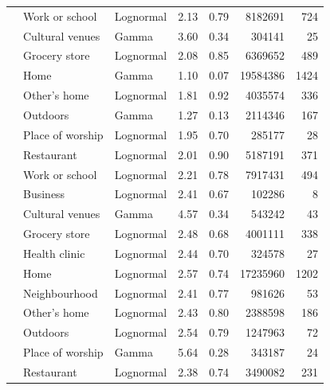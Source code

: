 \documentclass[preprint, 3p,
authoryear]{elsarticle} %
\begin{document}
\begin{table}
{\begin{threeparttable}
\begin{tabular}[t]{rllrrrr}
\multirow[t]{-8}{*}{\raggedleft\arraybackslash 2005} & Work or school & Lognormal & 2.13 & 0.79 & 8182691 & 724\\
\cmidrule{1-7}
 & Cultural venues & Gamma & 3.60 & 0.34 & 304141 & 25\\

 & Grocery store & Lognormal & 2.08 & 0.85 & 6369652 & 489\\

 & Home & Gamma & 1.10 & 0.07 & 19584386 & 1424\\

 & Other's home & Lognormal & 1.81 & 0.92 & 4035574 & 336\\

 & Outdoors & Gamma & 1.27 & 0.13 & 2114346 & 167\\

 & Place of worship & Lognormal & 1.95 & 0.70 & 285177 & 28\\

 & Restaurant & Lognormal & 2.01 & 0.90 & 5187191 & 371\\

\multirow[t]{-8}{*}{\raggedleft\arraybackslash 2010} & Work or school & Lognormal & 2.21 & 0.78 & 7917431 & 494\\
\cmidrule{1-7}
 & Business & Lognormal & 2.41 & 0.67 & 102286 & 8\\

 & Cultural venues & Gamma & 4.57 & 0.34 & 543242 & 43\\

 & Grocery store & Lognormal & 2.48 & 0.68 & 4001111 & 338\\

 & Health clinic & Lognormal & 2.44 & 0.70 & 324578 & 27\\

 & Home & Lognormal & 2.57 & 0.74 & 17235960 & 1202\\

 & Neighbourhood & Lognormal & 2.41 & 0.77 & 981626 & 53\\

 & Other's home & Lognormal & 2.43 & 0.80 & 2388598 & 186\\

 & Outdoors & Lognormal & 2.54 & 0.79 & 1247963 & 72\\

 & Place of worship & Gamma & 5.64 & 0.28 & 343187 & 24\\

 & Restaurant & Lognormal & 2.38 & 0.74 & 3490082 & 231\\


\end{tabular}
\end{threeparttable}}
\end{table}
\end{document}
